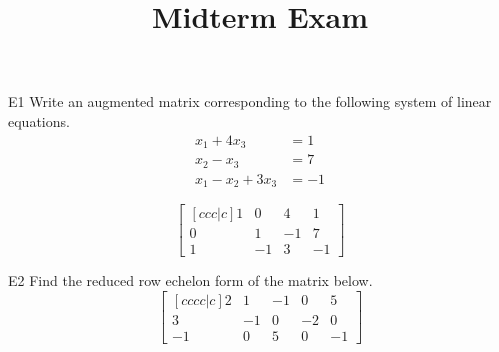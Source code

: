 \documentclass{sbgLAexam}
\title{Midterm Exam}
\begin{document}
\begin{problem}{E1}
Write an augmented matrix corresponding to the following system of linear equations.
\begin{align*}
x_1+4x_3 &= 1 \\
x_2-x_3 &= 7 \\
x_1-x_2+3x_3 &= -1
\end{align*}
\end{problem}
\begin{solution}
\[
\begin{bmatrix}[ccc|c]
1 & 0 & 4 & 1 \\
0 & 1 & -1 & 7 \\
1 & -1 & 3 & -1
\end{bmatrix}
\]
\end{solution}

\begin{problem}{E2}
Find the reduced row echelon form of the matrix below.
$$\begin{bmatrix}[cccc|c] 2 & 1 & -1 & 0 & 5 \\ 3 & -1 & 0 & -2 & 0 \\ -1 & 0 & 5 & 0 & -1 \end{bmatrix}$$
\end{problem}
\end{document}
